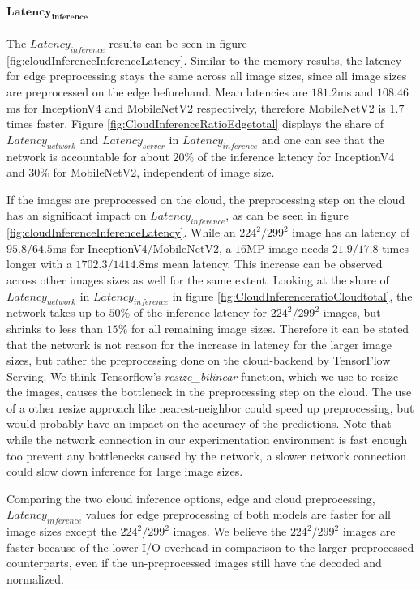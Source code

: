 \paragraph{$\mathbf{Latency_{inference}}$}
The $Latency_{inference}$ results can be seen in figure \ref{fig:cloudInferenceInferenceLatency}.
Similar to the memory results, the latency for edge preprocessing stays the same across all image sizes, since all image sizes are preprocessed on the edge beforehand. 
Mean latencies are $181.2$ms and $108.46$ms for InceptionV4 and MobileNetV2 respectively, therefore MobileNetV2 is $1.7$ times faster.
Figure \ref{fig:CloudInferenceRatioEdgetotal} displays the share of $Latency_{network}$ and $Latency_{server}$ in $Latency_{inference}$ and one can see that the network is accountable for about $20\%$ of the  inference latency for InceptionV4 and $30\%$ for MobileNetV2, independent of image size.

If the images are preprocessed on the cloud, the preprocessing step on the cloud has an significant impact on $Latency_{inference}$, as can be seen in figure \ref{fig:cloudInferenceInferenceLatency}.
While an $224^2/299^2$ image has an latency of $95.8/64.5$ms for InceptionV4/MobileNetV2, a $16$MP image needs $21.9/17.8$ times longer with a $1702.3/1414.8$ms mean latency.
This increase can be observed across other images sizes as well for the same extent. 
Looking at  the share of $Latency_{network}$ in $Latency_{inference}$ in figure \ref{fig:CloudInferenceratioCloudtotal}, the network takes up to $50\%$ of the inference latency for $224^2/299^2$ images, but shrinks to less than $15\%$ for all remaining image sizes.
Therefore it can be stated that the network is not reason for the increase in latency for the larger image sizes, but rather the preprocessing done on the cloud-backend by TensorFlow Serving.
We think Tensorflow's \emph{resize\_bilinear} function, which we use to resize the images, causes the bottleneck in the preprocessing step on the cloud.
The use of a other resize approach like nearest-neighbor could speed up preprocessing, but would probably have an impact on the accuracy of the predictions.
Note that while the network connection in our experimentation environment is fast enough too prevent any bottlenecks caused by the network, a slower network connection could slow down inference for large image sizes.

Comparing the two cloud inference options, edge and cloud preprocessing,  $Latency_{inference}$ values for edge preprocessing of both models are faster for all image sizes except the $224^2/299^2$ images.
We believe the $224^2/299^2$ images are faster because of the lower I/O overhead in comparison to the larger preprocessed counterparts, even if the un-preprocessed images still have the decoded and normalized.


